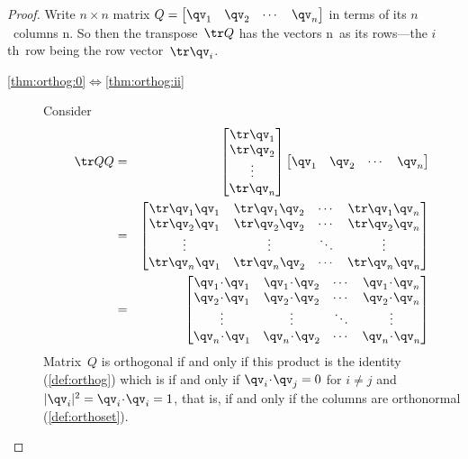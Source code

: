 \begin{proof} 
Write \(n\times n\) matrix \(Q=\begin{bmatrix} \qv_1&\qv_2&\cdots&\qv_n \end{bmatrix}\) in terms of its \(n\)~columns \hlist\qv n.
So then the transpose~\(\tr Q\) has the vectors \hlist\qv n\ as its rows---the \(i\)th~row being the row vector~\(\tr\qv_i\).
\begin{description}
\item[\ref{thm:orthog:0}$\iff$\ref{thm:orthog:ii}]   Consider
\begin{eqnarray*}
\tr QQ
&=&\begin{bmatrix} \tr\qv_1\\\tr\qv_2\\\vdots\\\tr\qv_n \end{bmatrix}
\begin{bmatrix} \qv_1&\qv_2&\cdots&\qv_n \end{bmatrix}
\\&=&\begin{bmatrix} \tr\qv_1\qv_1&\tr\qv_1\qv_2&\cdots&\tr\qv_1\qv_n 
\\ \tr\qv_2\qv_1&\tr\qv_2\qv_2&\cdots&\tr\qv_2\qv_n 
\\\vdots&\vdots&\ddots&\vdots
\\ \tr\qv_n\qv_1&\tr\qv_n\qv_2&\cdots&\tr\qv_n\qv_n \end{bmatrix}
\\&=&\begin{bmatrix} \qv_1\cdot\qv_1&\qv_1\cdot\qv_2&\cdots&\qv_1\cdot\qv_n 
\\ \qv_2\cdot\qv_1&\qv_2\cdot\qv_2&\cdots&\qv_2\cdot\qv_n 
\\\vdots&\vdots&\ddots&\vdots
\\ \qv_n\cdot\qv_1&\qv_n\cdot\qv_2&\cdots&\qv_n\cdot\qv_n \end{bmatrix}
\end{eqnarray*}
Matrix~\(Q\) is orthogonal if and only if this product is the identity  (\autoref{def:orthog}) which is if and only if \(\qv_i\cdot\qv_j=0\) for \(i\neq j\) and \(|\qv_i|^2=\qv_i\cdot\qv_i=1\), that is, if and only if the columns are orthonormal (\autoref{def:orthoset}).


\end{description}
\end{proof}
